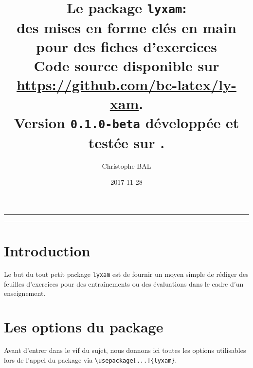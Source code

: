 \documentclass[12pt,a4paper]{scrartcl}
\theoremstyle{definition}
\begin{document}
\renewcommand\labelitemi{\raisebox{0.125em}{\tiny\textbullet}}
\renewcommand{\labelitemii}{---}

\title{%
	Le package \texttt{lyxam}:\\%
	des mises en forme clés en main\\%
	pour des fiches d'exercices\\%
	{\footnotesize Code source disponible sur \url{https://github.com/bc-latex/ly-xam}.}\\%
	{\footnotesize Version \texttt{0.1.0-beta} développée et testée sur \macosxname{}.}%
}
\author{Christophe BAL}
\date{2017-11-28}

\maketitle


\vspace{2em}

\hrule

\tableofcontents

\vspace{1.5em}

\hrule

\newpage



\section{Introduction}

Le but du tout petit package \verb+lyxam+ est de fournir un moyen simple de rédiger des feuilles d'exercices pour des entraînements ou des évaluations dans le cadre d'un enseignement.




\section{Les options du package}

Avant d'entrer dans le vif du sujet, nous donnons ici toutes les options utilisables lors de l'appel du package via \verb+\usepackage[...]{lyxam}+.
\end{document}
